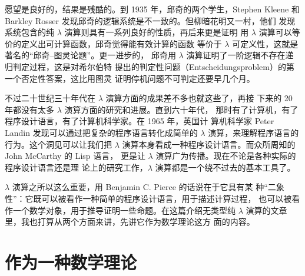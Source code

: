 \documentclass[a4paper,adobefonts]{ctexart}
\begin{document}
愿望是良好的，结果是残酷的。到 1935 年，邱奇的两个学生，Stephen Kleene
和 Barkley Rosser 发现邱奇的逻辑系统是不一致的。但柳暗花明又一村，他们
发现系统包含的纯 $\lambda$ 演算则具有一系列良好的性质，再后来更是证明
用 $\lambda$ 演算可以等价的定义出可计算函数，邱奇觉得能有效计算的函数
等价于 $\lambda$ 可定义性，这就是著名的``邱奇--图灵论题''。更一进步的，
邱奇用 $\lambda$ 演算证明了一阶逻辑不存在递归判定过程，这是对希尔伯特
提出的判定性问题（Entscheidungsproblem）的第一个否定性答案，这比用图灵
证明停机问题不可判定还要早几个月。

不过二十世纪三十年代在 $\lambda$ 演算方面的成果差不多也就这些了，再接
下来的 20 年都没有太多 $\lambda$ 演算方面的研究和进展。直到六十年代，
那时有了计算机，有了程序设计语言，有了计算机科学家。在 1965 年，英国计
算机科学家 Peter Landin 发现可以通过把复杂的程序语言转化成简单的
$\lambda$ 演算，来理解程序语言的行为。这个洞见可以让我们把 $\lambda$
演算本身看成一种程序设计语言。而众所周知的 John McCarthy 的 Lisp 语言，
更是让 $\lambda$ 演算广为传播。现在不论是各种实际的程序设计语言还是理
论上的研究工作，$\lambda$ 演算都是一个绕不过去的基本工具了。

$\lambda$ 演算之所以这么重要，用 Benjamin C. Pierce 的话说在于它具有某
种``二象性''：它既可以被看作一种简单的程序设计语言，用于描述计算过程，
也可以被看作一个数学对象，用于推导证明一些命题。在这篇介绍无类型纯
$\lambda$ 演算的文章里，我也打算从两个方面来讲，先讲它作为数学理论这方
面的内容。

\section{作为一种数学理论}
\end{document}
